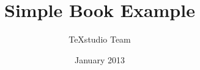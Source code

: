 \documentclass[a4paper,12pt]{book}
\begin{document}
\author{TeXstudio Team}
\title{Simple Book Example}
\date{January 2013}

\frontmatter
\maketitle
\tableofcontents

\mainmatter




\backmatter
\end{document}
